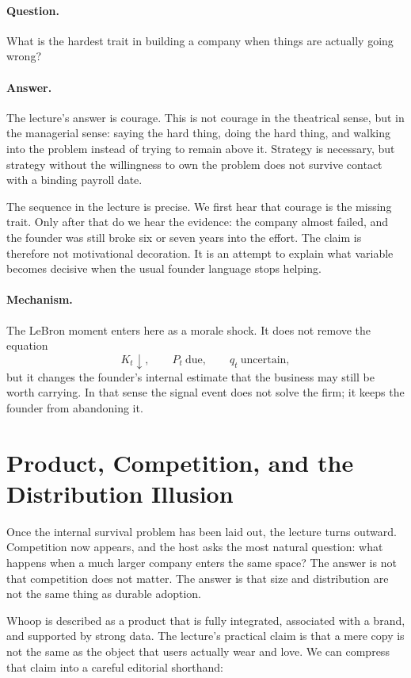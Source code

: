 \paragraph{Question.} What is the hardest trait in building a company when things are actually going wrong?

\paragraph{Answer.} The lecture's answer is courage. This is not courage in the theatrical sense, but in the managerial sense: saying the hard thing, doing the hard thing, and walking into the problem instead of trying to remain above it. Strategy is necessary, but strategy without the willingness to own the problem does not survive contact with a binding payroll date.

The sequence in the lecture is precise. We first hear that courage is the missing trait. Only after that do we hear the evidence: the company almost failed, and the founder was still broke six or seven years into the effort. The claim is therefore not motivational decoration. It is an attempt to explain what variable becomes decisive when the usual founder language stops helping.

\paragraph{Mechanism.} The LeBron moment enters here as a morale shock. It does not remove the equation
\[
K_t \downarrow,\qquad P_t\ \text{due},\qquad q_t\ \text{uncertain},
\]
but it changes the founder's internal estimate that the business may still be worth carrying. In that sense the signal event does not solve the firm; it keeps the founder from abandoning it.

\section{Product, Competition, and the Distribution Illusion}

Once the internal survival problem has been laid out, the lecture turns outward. Competition now appears, and the host asks the most natural question: what happens when a much larger company enters the same space? The answer is not that competition does not matter. The answer is that size and distribution are not the same thing as durable adoption.

Whoop is described as a product that is fully integrated, associated with a brand, and supported by strong data. The lecture's practical claim is that a mere copy is not the same as the object that users actually wear and love. We can compress that claim into a careful editorial shorthand:

